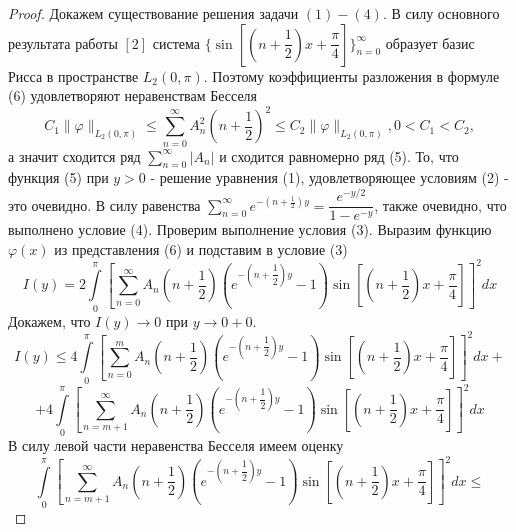 \documentclass[a4paper, 11pt]{article}
\begin{document}
	
	\begin{proof}
		
		
		Докажем существование решения задачи $(1) - (4)$. В силу основного результата работы $[2]$ система $\{\sin{\left[\left(n + \dfrac12\right)x + \dfrac\pi4\right]}\}_{n=0}^{\infty}$ образует базис Рисса в пространстве $L_2(0, \pi)$. Поэтому коэффициенты разложения в формуле (6) удовлетворяют неравенствам Бесселя
		\begin{equation*}
			C_1 \|\varphi \|_{L_2(0,\pi)} \leq \sum\limits_{n=0}^{\infty} A_n^2 \left(n + \dfrac12\right)^2 \leq C_2 \|\varphi \|_{L_2(0,\pi)} , 0 < C_1 < C_2, 
		\end{equation*}
		а значит сходится ряд $\sum\limits_{n=0}^{\infty} |A_n|$ и сходится равномерно ряд (5). То, что функция (5) при $y > 0$ - решение уравнения (1), удовлетворяющее условиям (2) - это очевидно. В силу равенства $\sum\limits_{n=0}^{\infty} e^{-\left(n + \frac12\right)y} = \dfrac{e^{-y/2}}{1 - e^{-y}}$, также очевидно, что выполнено условие (4). Проверим выполнение условия (3).\newline
		Выразим функцию $\varphi(x)$ из представления (6) и подставим в условие (3)
		\begin{equation*}
			I(y) =  2 \int\limits_0^\pi \left[	\sum\limits_{n=0}^{\infty} A_n\left(n+\dfrac12\right) \left( e^{-\left(n+\dfrac12\right)y} - 1\right) \sin{\left[\left(n+\dfrac12\right) x  + \dfrac\pi4\right]} \right]^2 dx
		\end{equation*}
		Докажем, что $I(y) \to 0$ при $y \to 0+0$. 
		\begin{equation*}
			I(y) \leq 4\int\limits_0^\pi \left[	\sum\limits_{n=0}^{m} A_n\left(n+\dfrac12\right) \left( e^{-\left(n+\dfrac12\right)y} - 1\right) \sin{\left[\left(n+\dfrac12\right) x  + \dfrac\pi4\right]} \right]^2 dx + 
		\end{equation*}
		\begin{equation*}
			+ 4\int\limits_0^\pi \left[	\sum\limits_{n=m+1}^{\infty} A_n\left(n+\dfrac12\right) \left( e^{-\left(n+\dfrac12\right)y} - 1\right) \sin{\left[\left(n+\dfrac12\right) x  + \dfrac\pi4\right]} \right]^2 dx
		\end{equation*}
		В силу левой части неравенства Бесселя имеем оценку
		\begin{equation*}
			\int\limits_0^\pi \left[	\sum\limits_{n=m+1}^{\infty} A_n\left(n+\dfrac12\right) \left( e^{-\left(n+\dfrac12\right)y} - 1\right) \sin{\left[\left(n+\dfrac12\right) x  + \dfrac\pi4\right]} \right]^2 dx \leq 
		\end{equation*}

\end{proof}
\end{document}
